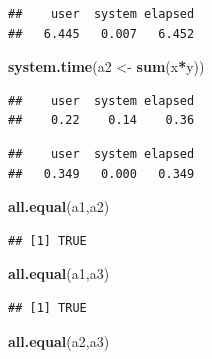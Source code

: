 \documentclass[]{book}
\newenvironment{Shaded}{\begin{snugshade}}{\end{snugshade}}
\newcommand{\KeywordTok}[1]{\textcolor[rgb]{0.13,0.29,0.53}{\textbf{#1}}}
\newcommand{\NormalTok}[1]{#1}
\newcommand{\OperatorTok}[1]{\textcolor[rgb]{0.81,0.36,0.00}{\textbf{#1}}}
\newcommand{\StringTok}[1]{\textcolor[rgb]{0.31,0.60,0.02}{#1}}
\theoremstyle{definition}
\theoremstyle{definition}
\theoremstyle{definition}
\theoremstyle{remark}
\begin{document}
\begin{verbatim}
##    user  system elapsed 
##   6.445   0.007   6.452
\end{verbatim}

\begin{Shaded}
\begin{Highlighting}[]
\KeywordTok{system.time}\NormalTok{(a2 <-}\StringTok{ }\KeywordTok{sum}\NormalTok{(x}\OperatorTok{*}\NormalTok{y))}
\end{Highlighting}
\end{Shaded}

\begin{verbatim}
##    user  system elapsed 
##    0.22    0.14    0.36
\end{verbatim}

\begin{Shaded}
\end{Shaded}

\begin{verbatim}
##    user  system elapsed 
##   0.349   0.000   0.349
\end{verbatim}

\begin{Shaded}
\begin{Highlighting}[]
\KeywordTok{all.equal}\NormalTok{(a1,a2)}
\end{Highlighting}
\end{Shaded}

\begin{verbatim}
## [1] TRUE
\end{verbatim}

\begin{Shaded}
\begin{Highlighting}[]
\KeywordTok{all.equal}\NormalTok{(a1,a3)}
\end{Highlighting}
\end{Shaded}

\begin{verbatim}
## [1] TRUE
\end{verbatim}

\begin{Shaded}
\begin{Highlighting}[]
\KeywordTok{all.equal}\NormalTok{(a2,a3)}
\end{Highlighting}
\end{Shaded}
\end{document}
